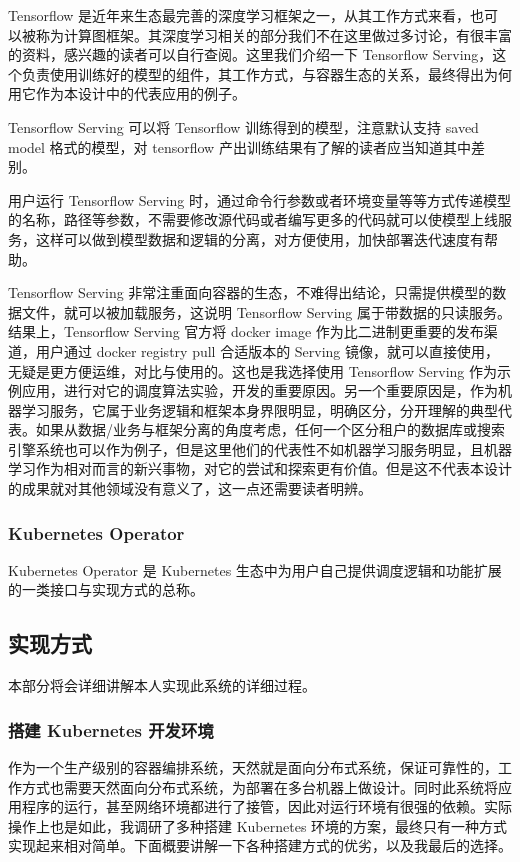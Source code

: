 Tensorflow 是近年来生态最完善的深度学习框架之一，从其工作方式来看，也可以被称为计算图框架。其深度学习相关的部分我们不在这里做过多讨论，有很丰富的资料，感兴趣的读者可以自行查阅。这里我们介绍一下 Tensorflow Serving，这个负责使用训练好的模型的组件，其工作方式，与容器生态的关系，最终得出为何用它作为本设计中的代表应用的例子。

Tensorflow Serving 可以将 Tensorflow 训练得到的模型，注意默认支持 saved model 格式的模型，对 tensorflow 产出训练结果有了解的读者应当知道其中差别。

用户运行 Tensorflow Serving 时，通过命令行参数或者环境变量等等方式传递模型的名称，路径等参数，不需要修改源代码或者编写更多的代码就可以使模型上线服务，这样可以做到模型数据和逻辑的分离，对方便使用，加快部署迭代速度有帮助。

Tensorflow Serving 非常注重面向容器的生态，不难得出结论，只需提供模型的数据文件，就可以被加载服务，这说明 Tensorflow Serving 属于带数据的只读服务。结果上，Tensorflow Serving 官方将 docker image 作为比二进制更重要的发布渠道，用户通过 docker registry pull 合适版本的 Serving 镜像，就可以直接使用，无疑是更方便运维，对比与使用的。这也是我选择使用 Tensorflow Serving 作为示例应用，进行对它的调度算法实验，开发的重要原因。另一个重要原因是，作为机器学习服务，它属于业务逻辑和框架本身界限明显，明确区分，分开理解的典型代表。如果从数据/业务与框架分离的角度考虑，任何一个区分租户的数据库或搜索引擎系统也可以作为例子，但是这里他们的代表性不如机器学习服务明显，且机器学习作为相对而言的新兴事物，对它的尝试和探索更有价值。但是这不代表本设计的成果就对其他领域没有意义了，这一点还需要读者明辨。

\subsubsection{Kubernetes Operator}

Kubernetes Operator 是 Kubernetes 生态中为用户自己提供调度逻辑和功能扩展的一类接口与实现方式的总称。

\subsection{实现方式}

本部分将会详细讲解本人实现此系统的详细过程。

\subsubsection{搭建 Kubernetes 开发环境}

作为一个生产级别的容器编排系统，天然就是面向分布式系统，保证可靠性的，工作方式也需要天然面向分布式系统，为部署在多台机器上做设计。同时此系统将应用程序的运行，甚至网络环境都进行了接管，因此对运行环境有很强的依赖。实际操作上也是如此，我调研了多种搭建 Kubernetes 环境的方案，最终只有一种方式实现起来相对简单。下面概要讲解一下各种搭建方式的优劣，以及我最后的选择。

